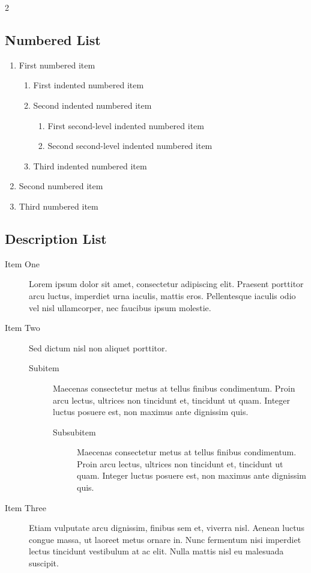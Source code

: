 \documentclass[
	a4paper, %
]{CSMakotoTechnicalReport}
\begin{document}
\begin{multicols}{2}

\subsection{Numbered List}

\begin{enumerate}
	\item First numbered item
	\begin{enumerate}
		\item First indented numbered item
		\item Second indented numbered item
		\begin{enumerate}
			\item First second-level indented numbered item
			\item Second second-level indented numbered item
		\end{enumerate}
		\item Third indented numbered item
	\end{enumerate}
	\item Second numbered item
	\item Third numbered item
\end{enumerate}


\subsection{Description List}

\begin{description}
	\item[Item One] Lorem ipsum dolor sit amet, consectetur adipiscing elit. Praesent porttitor arcu luctus, imperdiet urna iaculis, mattis eros. Pellentesque iaculis odio vel nisl ullamcorper, nec faucibus ipsum molestie. 
	\item[Item Two] Sed dictum nisl non aliquet porttitor.
	\begin{description}
		\item[Subitem] Maecenas consectetur metus at tellus finibus condimentum. Proin arcu lectus, ultrices non tincidunt et, tincidunt ut quam. Integer luctus posuere est, non maximus ante dignissim quis.
		\begin{description}
			\item[Subsubitem] Maecenas consectetur metus at tellus finibus condimentum. Proin arcu lectus, ultrices non tincidunt et, tincidunt ut quam. Integer luctus posuere est, non maximus ante dignissim quis.
	\end{description}
	\end{description}
	\item[Item Three] Etiam vulputate arcu dignissim, finibus sem et, viverra nisl. Aenean luctus congue massa, ut laoreet metus ornare in. Nunc fermentum nisi imperdiet lectus tincidunt vestibulum at ac elit. Nulla mattis nisl eu malesuada suscipit.
\end{description}


\end{multicols}
\end{document}
